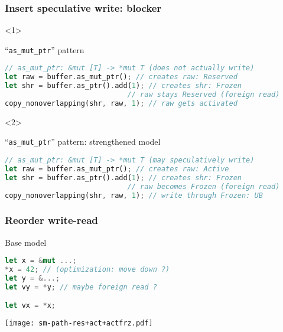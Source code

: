 \begin{frame}[fragile]
    \frametitle{Insert speculative write: blocker}
    \begin{onlyenv}<1>
        \begin{block}{{\cmark} ``\texttt{as\_mut\_ptr}'' pattern}
            \begin{lstlisting}[language=rust, basicstyle=\ttfamily\scriptsize]
// as_mut_ptr: &mut [T] -> *mut T (does not actually write)
let raw = buffer.as_mut_ptr(); // creates raw: Reserved
let shr = buffer.as_ptr().add(1); // creates shr: Frozen
                             // raw stays Reserved (foreign read)
copy_nonoverlapping(shr, raw, 1); // raw gets activated
            \end{lstlisting}
        \end{block}
    \end{onlyenv}

    \begin{onlyenv}<2>
        \begin{block}{{\xmark} ``\texttt{as\_mut\_ptr}'' pattern: strengthened model}
            \begin{lstlisting}[language=rust, basicstyle=\ttfamily\scriptsize]
// as_mut_ptr: &mut [T] -> *mut T (may speculatively write)
let raw = buffer.as_mut_ptr(); // creates raw: Active
let shr = buffer.as_ptr().add(1); // creates shr: Frozen
                             // raw becomes Frozen (foreign read)
copy_nonoverlapping(shr, raw, 1); // write through Frozen: UB
            \end{lstlisting}
        \end{block}
    \end{onlyenv}
\end{frame}

\begin{frame}[fragile, t]
    \frametitle{Reorder write-read}
    \begin{block}{{\xmark} Base model}
        \begin{lstlisting}[language=rust]
let x = &mut ...;
*x = 42; // (optimization: move down ?)
let y = &...;
let vy = *y; // maybe foreign read ?

let vx = *x;
        \end{lstlisting}
    \end{block}
    \texttt{[image: sm-path-res+act+actfrz.pdf]}
\end{frame}

